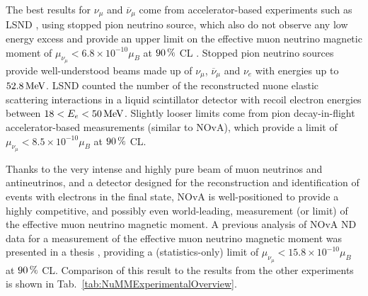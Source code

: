 
The best results for $\nu_\mu$ and $\overline{\nu}_\mu$ come from accelerator-based experiments such as LSND \cite{LSNDLimits2001.pdf,LAMPFAMuNuMM1990.pdf}, using stopped pion neutrino source, which also do not observe any low energy excess and provide an upper limit on the effective muon neutrino magnetic moment of $\mu_{\nu_\mu}<6.8\times 10^{-10}\mu_B$  at $\unit[90]{\%}$ \gls{CL} \cite{LSNDLimits2001.pdf}. Stopped pion neutrino sources provide well-understood beams made up of $\nu_\mu$, $\overline{\nu}_\mu$ and $\nu_e$ with energies up to $\unit[52.8]{MeV}$. LSND counted the number of the reconstructed \gls{nuone} elastic scattering interactions in a liquid scintillator detector with recoil electron energies between $18<E_e<\unit[50]{MeV}$. Slightly looser limits come from pion decay-in-flight accelerator-based measurements (similar to \gls{NOvA})\cite{NuoneForEMProp1990.pdf, Charm2MuonNuMM1995.pdf}, which provide a limit of $\mu_{\nu_\mu}<8.5\times 10^{-10}\mu_B$ at $\unit[90]{\%}$ \gls{CL}.





Thanks to the very intense and highly pure beam of muon neutrinos and antineutrinos, and a detector designed for the reconstruction and identification of events with electrons in the final state, \gls{NOvA} is well-positioned to provide a highly competitive, and possibly even world-leading, measurement (or limit) of the effective muon neutrino magnetic moment. A previous analysis of \gls{NOvA} \gls{ND} data for a measurement of the effective muon neutrino magnetic moment was presented in a thesis \cite{nuMM-thesis-biaow.pdf}, providing a (statistics-only) limit of $\mu_{\nu_\mu}<15.8\times 10^{-10}\mu_B$ at $\unit[90]{\%}$ \gls{CL}. Comparison of this result to the results from the other experiments is shown in Tab.~\ref{tab:NuMMExperimentalOverview}.

